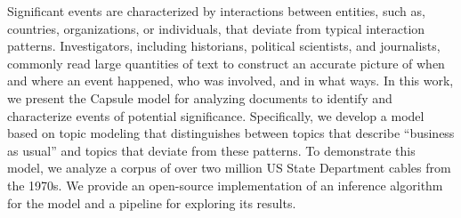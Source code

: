 
Significant events are characterized by interactions between entities,
such as, countries, organizations, or individuals, that deviate from
typical interaction patterns. Investigators, including historians,
political scientists, and journalists, commonly read large quantities
of text to construct an accurate picture of when and where an event
happened, who was involved, and in what ways. In this work, we present
the Capsule model for analyzing documents to identify and characterize
events of potential significance. Specifically, we develop a model
based on topic modeling that distinguishes between topics that
describe ``business as usual'' and topics that deviate from these
patterns. To demonstrate this model, we analyze a corpus of over two
million US State Department cables from the 1970s. We provide an
open-source implementation of an inference algorithm for the model and
a pipeline for exploring its results.
